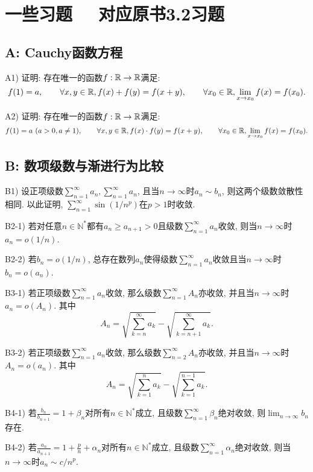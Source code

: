 \section*{一些习题 ~~\small 对应原书3.2习题}

\subsection*{A: Cauchy函数方程}

A1) 证明: 存在唯一的函数$f: \mathbb{R} \to \mathbb{R} $满足: $$f(1)=a , \qquad \forall x,y \in \mathbb{R} , f(x)+ f(y) = f(x+y),\qquad \forall x_0 \in \mathbb{R}, \lim_{x \to x_0} f(x)=f(x_0).$$

A2) 证明: 存在唯一的函数$f: \mathbb{R} \to \mathbb{R} $满足: $$f(1)=a ~(a>0,a \neq 1), \qquad \forall x,y \in \mathbb{R} , f(x)\cdot f(y) = f(x+y),\qquad \forall x_0 \in \mathbb{R}, \lim_{x \to x_0} f(x)=f(x_0).$$

\subsection*{B: 数项级数与渐进行为比较}

B1) 设正项级数$\sum_{n=1}^{\infty} a_n, \sum_{n=1}^{\infty} a_n$, 且当$n\to \infty$时$a_n \sim b_n$, 则这两个级数敛散性相同. 以此证明, $\sum_{n=1}^{\infty} \sin (1/n^p)$在$p>1$时收敛. 
\vspace{1em}

B2-1) 若对任意$n \in \mathbb{N}^*$都有$a_n \geq a_{n+1}>0$且级数$\sum_{n=1}^{\infty} a_n$收敛, 则当$n\to \infty$时$a_n=o(1/n)$. 
\vspace{1em}

B2-2) 若$b_n=o(1/n)$, 总存在数列$a_n$使得级数$\sum_{n=1}^{\infty} a_n$收敛且当$n\to \infty$时$b_n=o(a_n)$. 
\vspace{1em}

B3-1) 若正项级数$\sum_{n=1}^{\infty} a_n$收敛, 那么级数$\sum_{n=1}^{\infty} A_n$亦收敛, 并且当$n\to \infty$时$a_n=o(A_n)$. 其中$$A_n=\sqrt{\sum_{k=n}^{\infty} a_k} - \sqrt{\sum_{k=n+1}^{\infty} a_k}.$$

B3-2) 若正项级数$\sum_{n=1}^{\infty} a_n$收敛, 那么级数$\sum_{n=2}^{\infty} A_n$亦收敛, 并且当$n\to \infty$时$A_n=o(a_n)$. 其中$$A_n=\sqrt{\sum_{k=1}^{n} a_k} - \sqrt{\sum_{k=1}^{n-1} a_k}.$$

B4-1) 若$\frac{b_n}{b_{n+1}}=1+\beta _n$对所有$n \in \mathbb{N}^*$成立, 且级数$\sum_{n=1}^{\infty} \beta _n$绝对收敛, 则$\lim_{n\to \infty} b_n$存在. 
\vspace{1em}

B4-2) 若$\frac{a_n}{a_{n+1}}=1+\frac{p}{n} +\alpha _n$对所有$n \in \mathbb{N}^*$成立, 且级数$\sum_{n=1}^{\infty} \alpha _n$绝对收敛, 则当$n\to \infty$时$a_n \sim c/n^p$. 
\vspace{1em}

